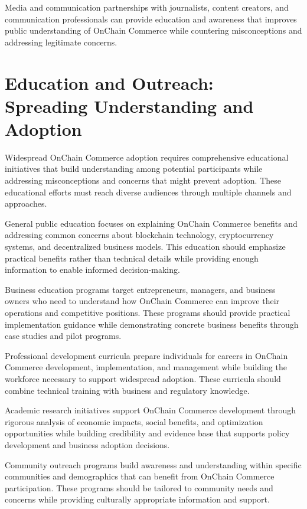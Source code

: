 \documentclass[
  Letterpaper,
]{scrbook}
\begin{document}
Media and communication partnerships with journalists, content creators,
and communication professionals can provide education and awareness that
improves public understanding of OnChain Commerce while countering
misconceptions and addressing legitimate concerns.

\section{Education and Outreach: Spreading Understanding and
Adoption}\label{education-and-outreach-spreading-understanding-and-adoption}

Widespread OnChain Commerce adoption requires comprehensive educational
initiatives that build understanding among potential participants while
addressing misconceptions and concerns that might prevent adoption.
These educational efforts must reach diverse audiences through multiple
channels and approaches.

General public education focuses on explaining OnChain Commerce benefits
and addressing common concerns about blockchain technology,
cryptocurrency systems, and decentralized business models. This
education should emphasize practical benefits rather than technical
details while providing enough information to enable informed
decision-making.

Business education programs target entrepreneurs, managers, and business
owners who need to understand how OnChain Commerce can improve their
operations and competitive positions. These programs should provide
practical implementation guidance while demonstrating concrete business
benefits through case studies and pilot programs.

Professional development curricula prepare individuals for careers in
OnChain Commerce development, implementation, and management while
building the workforce necessary to support widespread adoption. These
curricula should combine technical training with business and regulatory
knowledge.

Academic research initiatives support OnChain Commerce development
through rigorous analysis of economic impacts, social benefits, and
optimization opportunities while building credibility and evidence base
that supports policy development and business adoption decisions.

Community outreach programs build awareness and understanding within
specific communities and demographics that can benefit from OnChain
Commerce participation. These programs should be tailored to community
needs and concerns while providing culturally appropriate information
and support.
\end{document}
